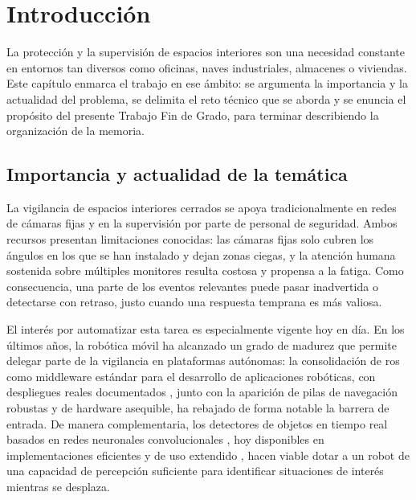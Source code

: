 \chapter{Introducción}
\label{cap:introduccion}

La protección y la supervisión de espacios interiores son una necesidad constante
en entornos tan diversos como oficinas, naves industriales, almacenes o viviendas.
Este capítulo enmarca el trabajo en ese ámbito: se argumenta la importancia y la
actualidad del problema, se delimita el reto técnico que se aborda y se enuncia el
propósito del presente Trabajo Fin de Grado, para terminar describiendo la
organización de la memoria.

\section{Importancia y actualidad de la temática}
\label{sec:importancia-actualidad}

La vigilancia de espacios interiores cerrados se apoya tradicionalmente en redes
de cámaras fijas y en la supervisión por parte de personal de seguridad. Ambos
recursos presentan limitaciones conocidas: las cámaras fijas solo cubren los
ángulos en los que se han instalado y dejan zonas ciegas, y la atención humana
sostenida sobre múltiples monitores resulta costosa y propensa a la fatiga. Como
consecuencia, una parte de los eventos relevantes puede pasar inadvertida o
detectarse con retraso, justo cuando una respuesta temprana es más valiosa.

El interés por automatizar esta tarea es especialmente vigente hoy en día. En los
últimos años, la robótica móvil ha alcanzado un grado de madurez que
permite delegar parte de la vigilancia en plataformas autónomas: la consolidación
de \gls{ros} como middleware estándar para el desarrollo de aplicaciones
robóticas, con despliegues reales documentados \parencite{macenski2022ros2}, junto
con la aparición de pilas de navegación robustas \parencite{macenski2020nav2} y de
hardware asequible, ha rebajado de forma notable la barrera de entrada. De manera
complementaria, los detectores de objetos en tiempo real basados en redes
neuronales convolucionales \parencite{redmon2016yolo}, hoy disponibles en
implementaciones eficientes y de uso extendido \parencite{jocher2023ultralytics},
hacen viable dotar a un robot de una capacidad de percepción suficiente para
identificar situaciones de interés mientras se desplaza.

